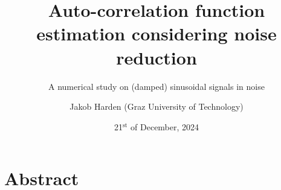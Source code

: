 \documentclass[11pt,aspectratio=169]{beamer}
\def\PresTitle{Auto-correlation function estimation considering noise reduction}
\def\PresSubTitle{A numerical study on (damped) sinusoidal signals in noise}
\def\PresDate{21${}^{\text{st}}$ of December, 2024}
\def\PresAuthorFirstname{Jakob}
\def\PresAuthorLastname{Harden}
\def\PresAuthor{\PresAuthorFirstname{} \PresAuthorLastname{}}
\def\PresAuthorAffiliation{Graz University of Technology}
\begin{document}
	\author{\PresAuthor{} (\PresAuthorAffiliation{})}
	\title{\PresTitle{}}
	\subtitle{\PresSubTitle{}}
	\date{\PresDate{}}
	\begin{frame}[plain]
		\maketitle
	\end{frame}
	\section*{Abstract}
\end{document}
